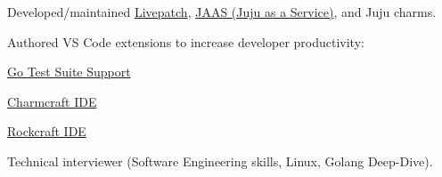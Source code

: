\documentclass[9pt,a4paper]{extarticle}
\begin{document}
\begin{customitemize}
    \item {}
    \begin{customitemize}
        \item {}
        \begin{customitemize}
            \item[] {}
            \item{Developed/maintained \href{https://ubuntu.com/security/livepatch}{Livepatch}, \href{https://jaas.ai/}{JAAS (Juju as a Service)}, and Juju charms.}
            \item{Authored VS Code extensions to increase developer productivity:}
            \begin{customitemize}
                \item{\href{https://marketplace.visualstudio.com/items?itemName=babakks.vscode-go-test-suite}{Go Test Suite Support} }
                \item{\href{https://marketplace.visualstudio.com/items?itemName=babakks.vscode-juju-charmcraft-ide}{Charmcraft IDE} }
                \item{\href{https://marketplace.visualstudio.com/items?itemName=babakks.vscode-rockcraft-ide}{Rockcraft IDE} }
            \end{customitemize}
            \item{Technical interviewer (Software Engineering skills, Linux, Golang Deep-Dive).}
        \end{customitemize}
    \end{customitemize}


\end{customitemize}
\end{document}
